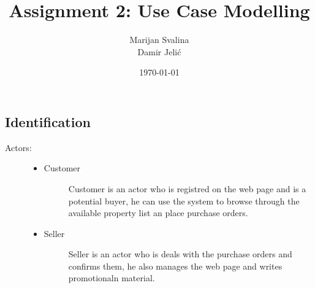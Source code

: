 \documentclass[12pt, titlepage]{article}
\title{Assignment 2: Use Case Modelling}
\date{\today}
\author{Marijan Svalina \\ Damir Jelić}
\begin{document}
\maketitle 

\setcounter{section}{2}
\subsection{Identification}

\begin{description}
    \item[Actors:] \hfil
    \begin{itemize}
    \item
        Customer
        \begin{description}
            \item[]Customer is an actor who is registred on the web page and is a potential buyer, 
            he can use the system to browse through the available 
            property list an place purchase orders. 
        \end{description}
    \item
        Seller
        \begin{description}
            \item[]Seller is an actor who is deals with the purchase orders and confirms them,
		    he also manages the web page and writes promotionaln material.
        \end{description}
    \end{itemize}


\end{description}
\end{document}
